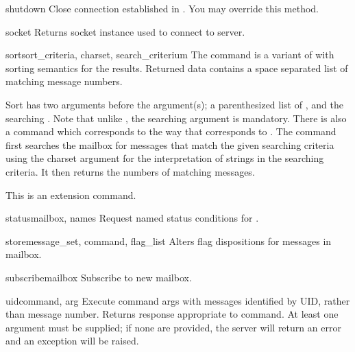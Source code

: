 \begin{methoddesc}{shutdown}{}
  Close connection established in .
  You may override this method.
\end{methoddesc}

\begin{methoddesc}{socket}{}
  Returns socket instance used to connect to server.
\end{methoddesc}

\begin{methoddesc}{sort}{sort_criteria, charset, search_criterium}
  The  command is a variant of  with sorting semantics for
  the results.  Returned data contains a space
  separated list of matching message numbers.

  Sort has two arguments before the 
  argument(s); a parenthesized list of , and the searching .
  Note that unlike , the searching  argument is mandatory.
  There is also a  command which corresponds to  the way
  that  corresponds to .
  The  command first searches the mailbox for messages that
  match the given searching criteria using the charset argument for
  the interpretation of strings in the searching criteria.  It then
  returns the numbers of matching messages.

  This is an  extension command.
\end{methoddesc}

\begin{methoddesc}{status}{mailbox, names}
  Request named status conditions for . 
\end{methoddesc}

\begin{methoddesc}{store}{message_set, command, flag_list}
  Alters flag dispositions for messages in mailbox.
\end{methoddesc}

\begin{methoddesc}{subscribe}{mailbox}
  Subscribe to new mailbox.
\end{methoddesc}

\begin{methoddesc}{uid}{command, arg}
  Execute command args with messages identified by UID, rather than
  message number.  Returns response appropriate to command.  At least
  one argument must be supplied; if none are provided, the server will
  return an error and an exception will be raised.
\end{methoddesc}

